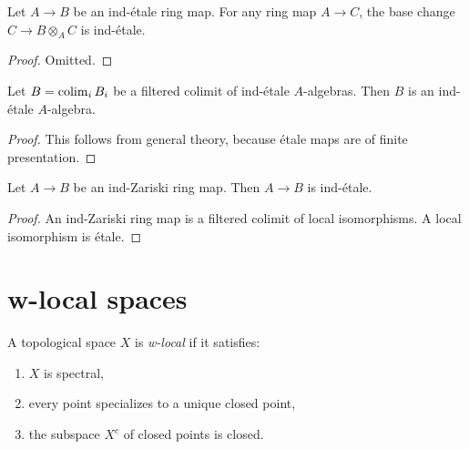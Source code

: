 \begin{lemma}
  \label{thm:ind-etale-base-change}
  \leanok
  Let $A \to B$ be an ind-étale ring map. For any ring map $A \to C$, the base change 
  $C \to B \otimes_A C$ is ind-étale.
\end{lemma}

\begin{proof}
  \leanok
  Omitted.
\end{proof}

\begin{lemma}
    Let $B = \operatorname{colim}_i B_i$ be a filtered colimit of ind-étale $A$-algebras. Then $B$ is
    an ind-étale $A$-algebra.
    \label{lemma:ind-ind-etale}
    \leanok
\end{lemma}

\begin{proof}
    \leanok
    This follows from general theory, because étale maps are of finite presentation.
\end{proof}

\begin{lemma}
  Let $A \to B$ be an ind-Zariski ring map. Then $A \to B$ is ind-étale.
  \label{thm:ind-Zariski-is-ind-etale}
  \leanok
\end{lemma}

\begin{proof}
  \leanok
  An ind-Zariski ring map is a filtered colimit of local isomorphisms. A local isomorphism is étale.
\end{proof}

\section{w-local spaces}

\begin{definition}
    \label{def:w-local-space}
    \leanok
    A topological space \(X\) is \emph{w-local} if it satisfies:
    \begin{enumerate}
        \item \(X\) is spectral,
        \item every point specializes to a unique closed point,
        \item the subspace \(X^c\) of closed points is closed.
    \end{enumerate}
\end{definition}

